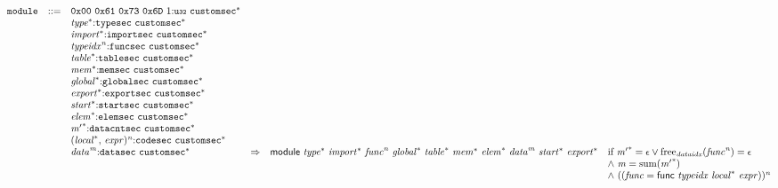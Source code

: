 $$
\begin{array}{@{}l@{}rrlll@{}l@{}}
& {\mathtt{module}} &::=& \mathtt{0x00}~\mathtt{0x61}~\mathtt{0x73}~\mathtt{0x6D}~1{:}{\mathtt{u{\scriptstyle32}}}~{{\mathtt{customsec}}^\ast} \\ &&&{{\mathit{type}}^\ast}{:}{\mathtt{typesec}}~{{\mathtt{customsec}}^\ast} \\ &&&{{\mathit{import}}^\ast}{:}{\mathtt{importsec}}~{{\mathtt{customsec}}^\ast} \\ &&&{{\mathit{typeidx}}^{{\mathit{n}}}}{:}{\mathtt{funcsec}}~{{\mathtt{customsec}}^\ast} \\ &&&{{\mathit{table}}^\ast}{:}{\mathtt{tablesec}}~{{\mathtt{customsec}}^\ast} \\ &&&{{\mathit{mem}}^\ast}{:}{\mathtt{memsec}}~{{\mathtt{customsec}}^\ast} \\ &&&{{\mathit{global}}^\ast}{:}{\mathtt{globalsec}}~{{\mathtt{customsec}}^\ast} \\ &&&{{\mathit{export}}^\ast}{:}{\mathtt{exportsec}}~{{\mathtt{customsec}}^\ast} \\ &&&{{\mathit{start}}^\ast}{:}{\mathtt{startsec}}~{{\mathtt{customsec}}^\ast} \\ &&&{{\mathit{elem}}^\ast}{:}{\mathtt{elemsec}}~{{\mathtt{customsec}}^\ast} \\ &&&{{\mathit{m}'}^\ast}{:}{\mathtt{datacntsec}}~{{\mathtt{customsec}}^\ast} \\ &&&{({{\mathit{local}}^\ast},\, {\mathit{expr}})^{{\mathit{n}}}}{:}{\mathtt{codesec}}~{{\mathtt{customsec}}^\ast} \\ &&&{{\mathit{data}}^{{\mathit{m}}}}{:}{\mathtt{datasec}}~{{\mathtt{customsec}}^\ast} &\Rightarrow& \mathsf{module}~{{\mathit{type}}^\ast}~{{\mathit{import}}^\ast}~{{\mathit{func}}^{{\mathit{n}}}}~{{\mathit{global}}^\ast}~{{\mathit{table}}^\ast}~{{\mathit{mem}}^\ast}~{{\mathit{elem}}^\ast}~{{\mathit{data}}^{{\mathit{m}}}}~{{\mathit{start}}^\ast}~{{\mathit{export}}^\ast} &\quad
  \mbox{if}~{{\mathit{m}'}^\ast} = \epsilon \lor {\mathrm{free}}_{{\mathit{dataidx}}}({{\mathit{func}}^{{\mathit{n}}}}) = \epsilon \\
 &&&&&&\quad {\land}~{\mathit{m}} = {\mathrm{sum}}({{\mathit{m}'}^\ast}) \\
 &&&&&&\quad {\land}~(({\mathit{func}} = \mathsf{func}~{\mathit{typeidx}}~{{\mathit{local}}^\ast}~{\mathit{expr}}))^{{\mathit{n}}} \\
\end{array}
$$

\vspace{1ex}


